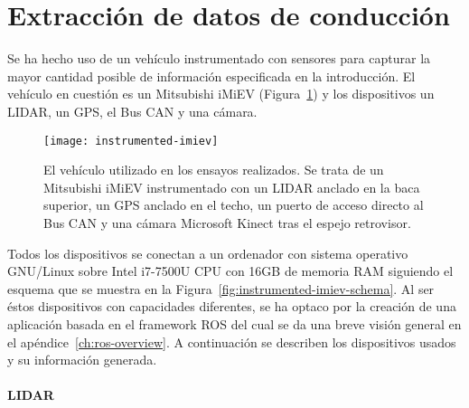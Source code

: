 \section{Extracción de datos de conducción}

Se ha hecho uso de un vehículo instrumentado con sensores para capturar la mayor cantidad posible de información especificada en la introducción. El vehículo en cuestión es un Mitsubishi iMiEV (Figura~\ref{fig:instrumented-imiev}) y los dispositivos un LIDAR, un GPS, el Bus CAN y una cámara.

\begin{figure}
	\texttt{[image: instrumented-imiev]}
	\caption{El vehículo utilizado en los ensayos realizados. Se trata de un Mitsubishi iMiEV instrumentado con un LIDAR anclado en la baca superior, un GPS anclado en el techo, un puerto de acceso directo al Bus CAN y una cámara Microsoft Kinect tras el espejo retrovisor.}
	\label{fig:instrumented-imiev}
\end{figure}

Todos los dispositivos se conectan a un ordenador con sistema operativo GNU/Linux sobre Intel i7-7500U CPU con 16GB de memoria RAM siguiendo el esquema que se muestra en la Figura~\ref{fig:instrumented-imiev-schema}. Al ser éstos dispositivos con capacidades diferentes, se ha optaco por la creación de una aplicación basada en el framework ROS del cual se da una breve visión general en el apéndice~\ref{ch:ros-overview}. A continuación se describen los dispositivos usados y su información generada.

\paragraph{LIDAR}



